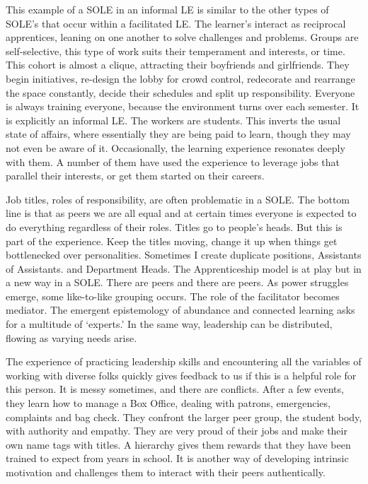 This example of a SOLE in an informal LE is similar to the other types
of SOLE's that occur within a facilitated LE. The learner's interact as
reciprocal apprentices, leaning on one another to solve challenges and
problems. Groups are self-selective, this type of work suits their
temperament and interests, or time. This cohort is almost a clique,
attracting their boyfriends and girlfriends. They begin initiatives,
re-design the lobby for crowd control, redecorate and rearrange the
space constantly, decide their schedules and split up responsibility.
Everyone is always training everyone, because the environment turns over
each semester. It is explicitly an informal LE. The workers are
students. This inverts the usual state of affairs, where essentially
they are being paid to learn, though they may not even be aware of it.
Occasionally, the learning experience resonates deeply with them. A
number of them have used the experience to leverage jobs that parallel
their interests, or get them started on their careers. 

Job
titles, roles of responsibility, are often problematic in a SOLE. The
bottom line is that as peers we are all equal and at certain times
everyone is expected to do everything regardless of their roles. Titles
go to people's heads. But this is part of the experience. Keep the
titles moving, change it up when things get bottlenecked over
personalities. Sometimes I create duplicate positions, Assistants of
Assistants. and Department Heads. The Apprenticeship model is at play
but in a new way in a SOLE. There are peers and there are peers. As
power struggles emerge, some like-to-like grouping occurs. The role of
the facilitator becomes mediator. The emergent epistemology of abundance
and connected learning asks for a multitude of `experts.' In the same
way, leadership can be distributed, flowing as varying needs arise.

The experience of practicing leadership skills and encountering all the
variables of working with diverse folks quickly gives feedback to us if
this is a helpful role for this person. It is messy sometimes, and there
are conflicts. After a few events, they learn how to manage a Box
Office, dealing with patrons, emergencies, complaints and bag check.
They confront the larger peer group, the student body, with authority
and empathy. They are very proud of their jobs and make their own name
tags with titles. A hierarchy gives them rewards that they have been
trained to expect from years in school. It is another way of developing
intrinsic motivation and challenges them to interact with their peers
authentically. 

